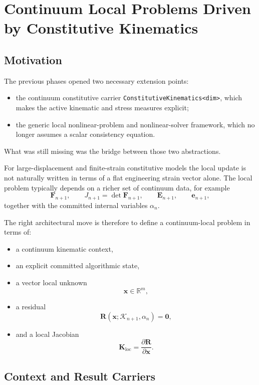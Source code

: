 \chapter{Continuum Local Problems Driven by Constitutive Kinematics}
\label{ch:continuum-local-problem-interface}

\section{Motivation}

The previous phases opened two necessary extension points:
\begin{itemize}
  \item the continuum constitutive carrier
        \texttt{ConstitutiveKinematics<dim>}, which makes the active kinematic
        and stress measures explicit;
  \item the generic local nonlinear-problem and nonlinear-solver framework,
        which no longer assumes a scalar consistency equation.
\end{itemize}

What was still missing was the bridge between those two abstractions.

For large-displacement and finite-strain constitutive models the local update
is not naturally written in terms of a flat engineering strain vector alone.
The local problem typically depends on a richer set of continuum data, for
example
\[
  \mathbf{F}_{n+1}, \qquad
  J_{n+1} = \det\mathbf{F}_{n+1}, \qquad
  \mathbf{E}_{n+1}, \qquad
  \mathbf{e}_{n+1},
\]
together with the committed internal variables $\alpha_n$.

The right architectural move is therefore to define a continuum-local problem
in terms of:
\begin{itemize}
  \item a continuum kinematic context,
  \item an explicit committed algorithmic state,
  \item a vector local unknown
        \[
          \mathbf{x} \in \mathbb{R}^m,
        \]
  \item a residual
        \[
          \mathbf{R}(\mathbf{x}; \mathcal{K}_{n+1}, \alpha_n) = \mathbf{0},
        \]
  \item and a local Jacobian
        \[
          \mathbf{K}_{\text{loc}} =
          \frac{\partial \mathbf{R}}{\partial \mathbf{x}}.
        \]
\end{itemize}

\section{Context and Result Carriers}

